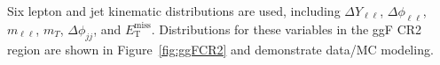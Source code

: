 Six lepton and jet kinematic distributions are used, including $\Delta Y_{\ell\ell}$, $\Delta \phi_{\ell\ell}$, $m_{\ell\ell}$, $m_T$, $\Delta \phi_{jj}$, and $\ensuremath{E_{\text{T}}^{\text{miss}}}$. Distributions for these variables in the ggF CR2 region are shown in Figure~\ref{fig:ggFCR2} and demonstrate data/MC modeling.
\begin{figure}[!h]
  \hfill
  \hfill
  \hfill
  \hfill

\end{figure}
